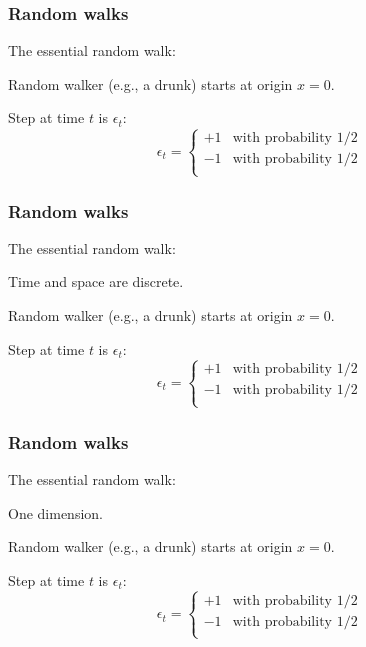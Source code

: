 \begin{frame}
  \frametitle{Random walks}

The essential random walk:

\inv
{}


Random walker (e.g., a drunk) starts at origin $x=0$.

Step at time $t$ is $\epsilon_t$:
$$
\epsilon_t = 
\left\{
    \begin{array}{ll}
      +1 & \mbox{with probability 1/2} \\
      -1 & \mbox{with probability 1/2} \\
    \end{array}
\right.
$$

\end{frame}

\begin{frame}
  \frametitle{Random walks}

The essential random walk:


\inv

 Time and space are discrete.

Random walker (e.g., a drunk) starts at origin $x=0$.

Step at time $t$ is $\epsilon_t$:
$$
\epsilon_t = 
\left\{
    \begin{array}{ll}
      +1 & \mbox{with probability 1/2} \\
      -1 & \mbox{with probability 1/2} \\
    \end{array}
\right.
$$

\end{frame}

\begin{frame}
  \frametitle{Random walks}

The essential random walk:

 One dimension.


\inv

Random walker (e.g., a drunk) starts at origin $x=0$.

Step at time $t$ is $\epsilon_t$:
$$
\epsilon_t = 
\left\{
    \begin{array}{ll}
      +1 & \mbox{with probability 1/2} \\
      -1 & \mbox{with probability 1/2} \\
    \end{array}
\right.
$$

\end{frame}

